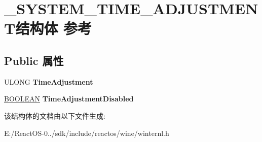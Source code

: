 \hypertarget{struct___s_y_s_t_e_m___t_i_m_e___a_d_j_u_s_t_m_e_n_t}{}\section{\+\_\+\+S\+Y\+S\+T\+E\+M\+\_\+\+T\+I\+M\+E\+\_\+\+A\+D\+J\+U\+S\+T\+M\+E\+N\+T结构体 参考}
\label{struct___s_y_s_t_e_m___t_i_m_e___a_d_j_u_s_t_m_e_n_t}
\subsection*{Public 属性}
\begin{DoxyCompactItemize}
\item 
\mbox{\label{struct___s_y_s_t_e_m___t_i_m_e___a_d_j_u_s_t_m_e_n_t_a638ddb42b12f167a9a5bb299e8c18ded}} 
U\+L\+O\+NG {\bfseries Time\+Adjustment}
\item 
\mbox{\label{struct___s_y_s_t_e_m___t_i_m_e___a_d_j_u_s_t_m_e_n_t_a4e22485b7a30345e200242080babf290}} 
\hyperlink{_processor_bind_8h_a112e3146cb38b6ee95e64d85842e380a}{B\+O\+O\+L\+E\+AN} {\bfseries Time\+Adjustment\+Disabled}
\end{DoxyCompactItemize}


该结构体的文档由以下文件生成\+:\begin{DoxyCompactItemize}
\item 
E\+:/\+React\+O\+S-\/0../sdk/include/reactos/wine/winternl.\+h\end{DoxyCompactItemize}
